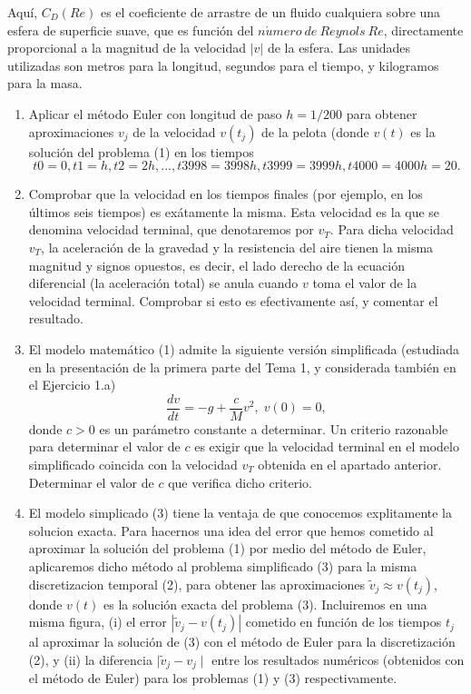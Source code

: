 \documentclass[12pt,a4paper]{article}
\begin{document}
Aquí, $C_{D}(Re)$ es el coeficiente de arrastre de un fluido cualquiera sobre una esfera de superficie suave, que es función del $n\acute{u}mero\:de\:Reynols\:Re$, directamente proporcional a la magnitud de la velocidad $|v|$ de la esfera. Las unidades utilizadas son metros para la longitud, segundos para el tiempo, y kilogramos para la masa.
\begin{enumerate}
\item 
Aplicar el método Euler con longitud de paso $h = 1/200$ para obtener aproximaciones $v_j$ de la velocidad $v(t_j)$ de la pelota (donde $v(t)$ es la solución del problema (1) en los tiempos
\begin{equation}
t0 = 0, t1 = h, t2 = 2h,...,t3998 = 3998h, t3999 = 3999h, t4000 = 4000h = 20. 
\end{equation}

\item
Comprobar que la velocidad en los tiempos finales (por ejemplo, en los últimos seis tiempos) es exátamente la misma. Esta velocidad es la que se denomina velocidad terminal, que denotaremos por $v_T$. Para dicha velocidad $v_T$, la aceleración de la gravedad y la resistencia del aire tienen la misma magnitud y signos opuestos, es decir, el lado derecho de la ecuación diferencial (la aceleración total) se anula cuando $v$ toma el valor de la velocidad terminal. Comprobar si esto es efectivamente así, y comentar el resultado.

\item
El modelo matemático (1) admite la siguiente versión simplificada (estudiada en la presentación de la primera parte del Tema 1, y considerada también en el Ejercicio 1.a)
\begin{equation}
\frac{dv}{dt} = -g+\frac{c}{M}v^{2},\; v(0) = 0,
\end{equation}
donde $c > 0$ es un parámetro constante a determinar. Un criterio razonable para determinar el valor de $c$ es exigir que la velocidad terminal en el modelo simplificado coincida con la velocidad $v_T$ obtenida en el apartado anterior. Determinar el valor de $c$ que verifica dicho criterio.

\item
El modelo simplicado (3) tiene la ventaja de que conocemos explitamente la solucion exacta. Para hacernos una idea del error que hemos cometido al aproximar la solución del problema (1) por medio del método de Euler, aplicaremos dicho método al problema simplificado (3) para la misma discretizacion temporal (2), para obtener las aproximaciones $\tilde{v}_j \approx v(t_j)$, donde $v(t)$ es la solución exacta del problema (3). Incluiremos en una misma figura, (i) el error $|\tilde{v}_j - v(t_j)|$ cometido en función de los tiempos $t_j$ al aproximar la solución de (3) con el método de Euler para la discretización (2), y (ii) la diferencia $\mid\tilde{v}_j - v_j\mid$ entre los resultados numéricos (obtenidos con el método de Euler) para los problemas (1) y (3) respectivamente.


\end{enumerate}
\end{document}
